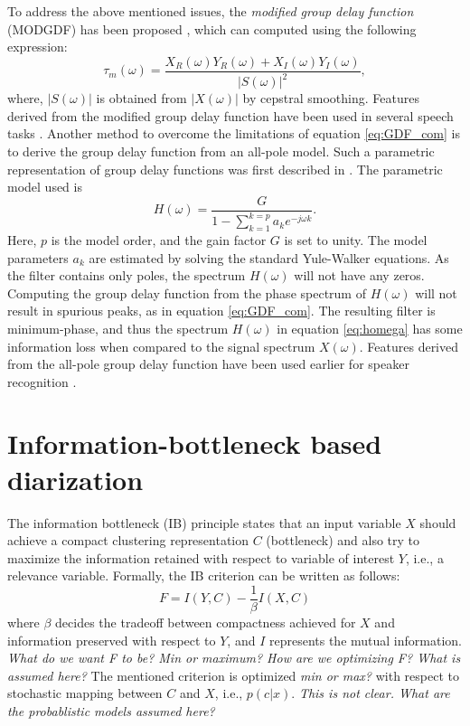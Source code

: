 \documentclass[conference]{IEEEtran}
\begin{document}
To address the above mentioned issues, the
\textit{modified group delay function} (MODGDF) has been proposed
\cite{modifiedGD}, which can
computed using the following expression:
\begin{equation}
\tau_{m}(\omega) =  
\frac{X_R(\omega)Y_R(\omega) + X_I(\omega)Y_I(\omega)}{|S(\omega)|^2}, 
\label{eq:MODGDF}
\end{equation}
where, $|S(\omega)|$ is obtained from $|X(\omega)|$ by cepstral smoothing.
Features derived from the modified group delay function have been used in
several speech tasks \cite{modifiedGD}.
Another method to overcome the limitations of equation \ref{eq:GDF_com} is to
derive the group delay function from an all-pole model. Such a parametric
representation of group delay functions was first described in \cite{yegnaJASA}.
The parametric model used is
\begin{equation}
H(\omega) =  \frac{G}{1 - \sum_{k=1}^{k = p} a_k e^{-j\omega k}}.
\label{eq:homega}
\end{equation}
Here, $p$ is the model order, and the gain factor $G$ is set to unity. The model
parameters $a_k$ are estimated by solving the standard Yule-Walker equations. As
the filter contains only poles, the spectrum $H(\omega)$ will not have any
zeros.  Computing the group delay function from the phase spectrum of
$H(\omega)$ will not result in spurious peaks, as in equation \ref{eq:GDF_com}.
The resulting filter is minimum-phase, and thus the spectrum $H(\omega)$ in
equation \ref{eq:homega} has some information loss when compared to the signal
spectrum $X(\omega)$. Features derived from the all-pole group delay function
have been used earlier for speaker recognition \cite{allPoleGdSid}.

\section{Information-bottleneck based diarization}
\label{system}


The information bottleneck (IB) principle states that an input variable $X$ should
achieve a compact clustering representation $C$ (bottleneck) and also try to
maximize the information retained with respect to variable of interest $Y$,
i.e., a relevance variable. Formally, the IB criterion can be written as
follows:
\begin{equation}
\label{eq:aIB}
F = I(Y,C) - \frac{1}{\beta}I(X,C) 
\end{equation} 
where $\beta$ decides the tradeoff between compactness achieved for $X$ and
information preserved with respect to $Y$, and $I$ represents the mutual
information. 
\textit{What do we want F to be? Min or maximum? How are we optimizing F? What
is assumed here?}
The mentioned criterion is optimized \textit{min or max?}
with respect to stochastic mapping between $C$ and $X$, i.e., $p(c|x)$.
\textit{This is not clear. What are the probablistic models assumed here?}
\end{document}
